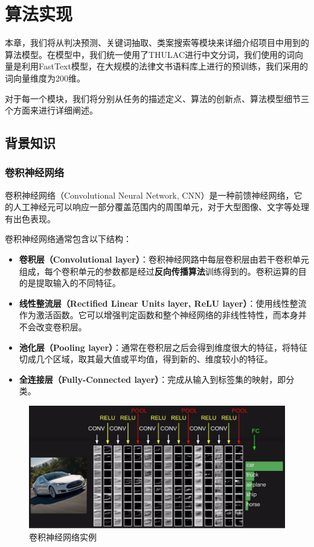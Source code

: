 \chapter{算法实现}
本章，我们将从判决预测、关键词抽取、类案搜索等模块来详细介绍项目中用到的算法模型。在模型中，我们统一使用了THULAC进行中文分词，我们使用的词向量是利用FastText模型，在大规模的法律文书语料库上进行的预训练，我们采用的词向量维度为200维。

对于每一个模块，我们将分别从任务的描述定义、算法的创新点、算法模型细节三个方面来进行详细阐述。

\iffalse
\section{背景知识}
\subsection{卷积神经网络}
卷积神经网络（Convolutional Neural Network, CNN）是一种前馈神经网络，它的人工神经元可以响应一部分覆盖范围内的周围单元，对于大型图像、文字等处理有出色表现。

卷积神经网络通常包含以下结构：

\begin{itemize}
	\item \textbf{卷积层（Convolutional layer）}：卷积神经网路中每层卷积层由若干卷积单元组成，每个卷积单元的参数都是经过\textbf{反向传播算法}训练得到的。卷积运算的目的是提取输入的不同特征。
	\item \textbf{线性整流层（Rectified Linear Units layer, ReLU layer）}：使用线性整流作为激活函数。它可以增强判定函数和整个神经网络的非线性特性，而本身并不会改变卷积层。
	\item \textbf{池化层（Pooling layer）}：通常在卷积层之后会得到维度很大的特征，将特征切成几个区域，取其最大值或平均值，得到新的、维度较小的特征。
	\item \textbf{全连接层（Fully-Connected layer）}：完成从输入到标签集的映射，即分类。
\end{itemize}

\begin{figure}[h]
    \centering
    \includegraphics[width=\linewidth]{figures/cnn1}
    \caption{卷积神经网络实例}
    \label{fig:cnn1}
\end{figure}

